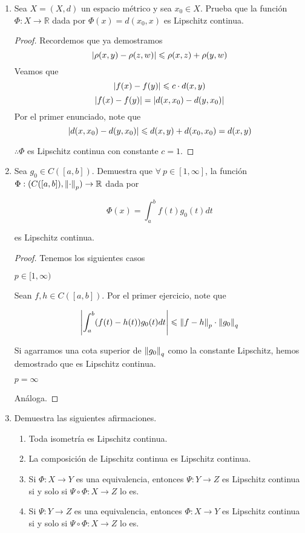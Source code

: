 \documentclass[12pt]{article}
\newcommand\R{\ensuremath{\mathbb{R}}}
\begin{document}
\begin{enumerate}[label=\textbf{\arabic*}.]
\begin{proof}
    Pero esto no se puede, ya que los números reales no están acotados superiormente. 
    
    $\therefore \Phi$ no es Lipschitz continua. 
\end{proof}

\item Sea $X=(X,d)$ un espacio métrico y sea $x_0 \in X$. Prueba que la función $\Phi : X \to \R$ dada por $\Phi(x) = d(x_0,x)$ es Lipschitz continua. 

\begin{proof}
    Recordemos que ya demostramos 
    $$\abs{\rho(x,y)-\rho(z,w)} \leqslant \rho(x,z) +\rho(y,w) $$
    Veamos que 
    $$ \abs{f(x)-f(y)} \leqslant c \cdot d(x,y)$$
    $$\abs{f(x)-f(y)} = \abs{d(x,x_0)-d(y,x_0)}$$
    Por el primer enunciado, note que
    $$\abs{d(x,x_0)-d(y,x_0)} \leqslant d(x,y) + d(x_0,x_0) = d(x,y) $$

    $\therefore \Phi$ es Lipschitz continua con constante $c=1$.
\end{proof}

\item Sea $g_0 \in C([a,b])$. Demuestra que $\forall \: p \in [1,\infty]$, la función $\Phi : (C([a,b]), {\norm{\cdot}}_{p}) \to \R$ dada por

$$ \Phi (x) = \int_{a}^{b} f(t)g_0 (t) dt$$

es Lipschitz continua.

\begin{proof}
    Tenemos los siguientes casos

    $p \in [1,\infty)$

    Sean $f,h \in C([a,b])$. Por el primer ejercicio, note que

    $$ \abs{\int_{a}^{b} (f(t)-h(t))g_0 (t) dt} \leqslant \norm{f-h}_p \cdot \norm{g_0}_q$$ 

    Si agarramos una cota superior de $\norm{g_0}_q$ como la constante Lipschitz, hemos demostrado que es Lipschitz continua. 

    $p = \infty$

    Análoga. 
\end{proof}

\item  Demuestra las siguientes afirmaciones.
\begin{enumerate}
    \item  Toda isometría es Lipschitz continua.
    \item  La composición de Lipschitz continua es Lipschitz continua. 
    \item Si $\Phi : X \to Y $ es una equivalencia, entonces $\Psi: Y \to Z$ es Lipschitz continua si y solo si $\Psi \circ \Phi: X \to Z$ lo es.
     \item Si $\Psi: Y \to Z$ es una equivalencia, entonces $\Phi : X \to Y $ es Lipschitz continua si y solo si $\Psi \circ \Phi: X \to Z$ lo es.
\end{enumerate}


\end{enumerate}
\end{document}

